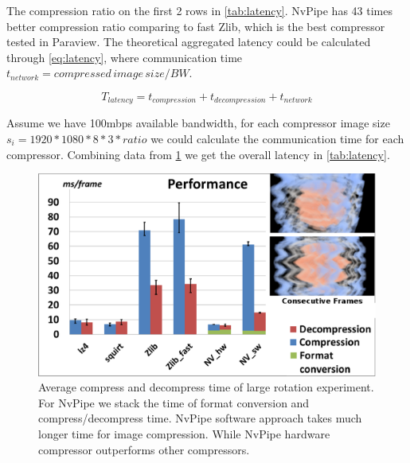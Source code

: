 \documentclass[review]{vgtc}                 %
\begin{document}
The compression ratio on the first 2 rows in \cref{tab:latency}. NvPipe has 43 times better compression ratio comparing to fast Zlib, which is the best compressor tested in Paraview.
The theoretical aggregated latency could be calculated through \cref{eq:latency}, where communication time \(t_{network}={compressed\, image\, size}/{BW}\). 

\begin{equation}
\label{eq:latency}
T_{latency}=t_{compression}+t_{decompression}+t_{network}
\end{equation}

Assume we have 100mbps available bandwidth, for each compressor image size \(s_i=1920*1080*8*3*{ratio}\) we could calculate the communication time for each compressor. Combining data from \cref{fig:time} we get the overall latency in \cref{tab:latency}.

\begin{figure}[t]
  \centering
  \includegraphics[width=\columnwidth]{Performance.eps}
  \caption{ Average compress and decompress time of large rotation experiment. For NvPipe we stack the time of format conversion and compress/decompress time. NvPipe software approach takes much longer time for image compression. While NvPipe hardware compressor outperforms other compressors.}
  \label{fig:time}
\end{figure}
\end{document}
